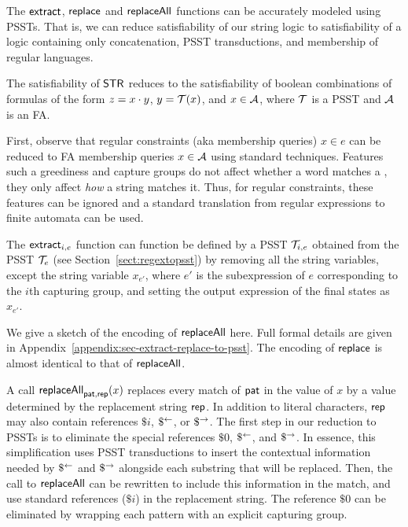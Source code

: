 
The $\mathsf{extract}$, $\mathsf{replace}$ and $\mathsf{replaceAll}$ functions can be accurately modeled using PSSTs.
That is, we can reduce satisfiability of our string logic to satisfiability of a logic containing only concatenation, PSST transductions, and membership of regular languages.

\begin{lemma}\label{lem-str-fun-to-psst}
    The satisfiability of $\mathsf{STR}$ reduces to the satisfiability of boolean combinations of formulas of the form $z=x \cdot y$, $y=\mathcal{T}(x)$, and $x \in \mathcal{A}$, where $\mathcal{T}$ is a PSST and $\mathcal{A}$ is an FA.
\end{lemma}

First, observe that regular constraints (aka membership queries) $x \in e$ can be reduced to FA membership queries $x \in \mathcal{A}$ using standard techniques.
Features such a greediness and capture groups do not affect whether a word matches a {\regexp}, they only affect \emph{how} a string matches it.
Thus, for  regular constraints, these features can be ignored and a standard translation from regular expressions to finite automata can be used.

The $\mathsf{extract}_{i,e}$ function can function be defined by a PSST $\mathcal{T}_{i,e}$ obtained from the PSST $\mathcal{T}_e$ (see Section~\ref{sect:regextopsst}) by removing all the string variables, except the string variable $x_{e'}$, where $e'$ is the subexpression of $e$ corresponding to the $i$th capturing group, and setting the output expression of the final states as $x_{e'}$.

We give a sketch of the encoding of $\mathsf{replaceAll}$ here.
Full formal details are given in Appendix~\ref{appendix:sec-extract-replace-to-psst}.
The encoding of $\mathsf{replace}$ is almost identical to that of $\mathsf{replaceAll}$.

A call $\mathsf{replaceAll}_{\mathsf{pat}, \mathsf{rep}}(x)$ replaces every match of $\mathsf{pat}$ in the value of $x$ by a value determined by the replacement string $\mathsf{rep}$.
In addition to literal characters, $\mathsf{rep}$ may also contain references $\$i$, $\$^{\leftarrow}$, or $\$^{\rightarrow}$.
The first step in our reduction to PSSTs is to eliminate the special references $\$0$, $\$^{\leftarrow}$, and $\$^{\rightarrow}$.
In essence, this simplification uses PSST transductions to insert the contextual information needed by $\$^{\leftarrow}$ and $\$^{\rightarrow}$ alongside each substring that will be replaced.
Then, the call to $\mathsf{replaceAll}$ can be rewritten to include this information in the match, and use standard references ($\$i$) in the replacement string.
The reference $\$0$ can be eliminated by wrapping each pattern with an explicit capturing group.

